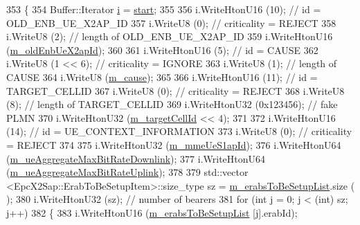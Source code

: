 \begin{DoxyCode}
353 \{
354   Buffer::Iterator \hyperlink{bernuolliDistribution_8m_a6f6ccfcf58b31cb6412107d9d5281426}{i} = \hyperlink{namespacevisualizer_1_1core_a2a35e5d8a34af358b508dac8635754e0}{start};
355 
356   i.WriteHtonU16 (10);              \textcolor{comment}{// id = OLD\_ENB\_UE\_X2AP\_ID}
357   i.WriteU8 (0);                    \textcolor{comment}{// criticality = REJECT}
358   i.WriteU8 (2);                    \textcolor{comment}{// length of OLD\_ENB\_UE\_X2AP\_ID}
359   i.WriteHtonU16 (\hyperlink{classns3_1_1EpcX2HandoverRequestHeader_ab561fa0398d95bd851a5fe6c619679f0}{m\_oldEnbUeX2apId});
360 
361   i.WriteHtonU16 (5);               \textcolor{comment}{// id = CAUSE}
362   i.WriteU8 (1 << 6);               \textcolor{comment}{// criticality = IGNORE}
363   i.WriteU8 (1);                    \textcolor{comment}{// length of CAUSE}
364   i.WriteU8 (\hyperlink{classns3_1_1EpcX2HandoverRequestHeader_a6d77424810dfac9f9e2a3c101994f0d7}{m\_cause});
365 
366   i.WriteHtonU16 (11);              \textcolor{comment}{// id = TARGET\_CELLID}
367   i.WriteU8 (0);                    \textcolor{comment}{// criticality = REJECT}
368   i.WriteU8 (8);                    \textcolor{comment}{// length of TARGET\_CELLID}
369   i.WriteHtonU32 (0x123456);        \textcolor{comment}{// fake PLMN}
370   i.WriteHtonU32 (\hyperlink{classns3_1_1EpcX2HandoverRequestHeader_aa146eb52b19271b8d5dc1d497d7dedf6}{m\_targetCellId} << 4);
371 
372   i.WriteHtonU16 (14);              \textcolor{comment}{// id = UE\_CONTEXT\_INFORMATION}
373   i.WriteU8 (0);                    \textcolor{comment}{// criticality = REJECT}
374 
375   i.WriteHtonU32 (\hyperlink{classns3_1_1EpcX2HandoverRequestHeader_a1aeefbd88fbfa59cbcf23f80f9bf231b}{m\_mmeUeS1apId});
376   i.WriteHtonU64 (\hyperlink{classns3_1_1EpcX2HandoverRequestHeader_aebe77ff780afed71a9723a06cf07b83f}{m\_ueAggregateMaxBitRateDownlink});
377   i.WriteHtonU64 (\hyperlink{classns3_1_1EpcX2HandoverRequestHeader_a3e0ee6a533a2b73117d0a154670115a4}{m\_ueAggregateMaxBitRateUplink});
378 
379   std::vector <EpcX2Sap::ErabToBeSetupItem>::size\_type sz = \hyperlink{classns3_1_1EpcX2HandoverRequestHeader_a201338ba8572bf4c8b88e5bc79ba1153}{m\_erabsToBeSetupList}.size (
      ); 
380   i.WriteHtonU32 (sz);              \textcolor{comment}{// number of bearers}
381   \textcolor{keywordflow}{for} (\textcolor{keywordtype}{int} j = 0; j < (int) sz; j++)
382     \{
383       i.WriteHtonU16 (\hyperlink{classns3_1_1EpcX2HandoverRequestHeader_a201338ba8572bf4c8b88e5bc79ba1153}{m\_erabsToBeSetupList} [j].erabId);

\end{DoxyCode}
